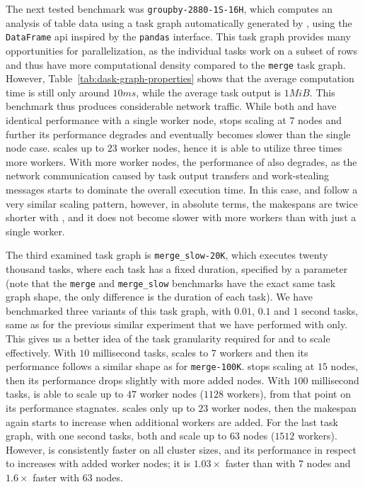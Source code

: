 The next tested benchmark was \texttt{groupby-2880-1S-16H}, which computes an analysis of table data
using a task graph automatically generated by \dask{}, using the
\texttt{DataFrame} \gls{api} inspired by the \texttt{pandas}
interface. This task graph provides many opportunities for parallelization, as the individual tasks
work on a subset of rows and thus have more computational density compared to the
\texttt{merge} task graph. However, Table~\ref{tab:dask-graph-properties} shows that the
average computation time is still only around $10ms$, while the average task
output is $1 MiB$. This benchmark thus produces considerable network traffic.
While both \dask{} and \rsds{} have identical performance
with a single worker node, \dask{} stops scaling at $7$
nodes and further its performance degrades and eventually becomes slower than the single node case.
\rsds{} scales up to $23$ worker nodes, hence it is able
to utilize three times more workers. With more worker nodes, the performance of
\rsds{} also degrades, as the network communication caused by task output
transfers and work-stealing messages starts to dominate the overall execution time. In this case,
\dask{} and \rsds{} follow a very similar scaling pattern,
however, in absolute terms, the makespans are twice shorter with \rsds{}, and
it does not become slower with more workers than with just a single worker.

The third examined task graph is \texttt{merge\_slow-20K}, which executes twenty thousand tasks,
where each task has a fixed duration, specified by a parameter (note that the
\texttt{merge} and \texttt{merge\_slow} benchmarks have the exact same task
graph shape, the only difference is the duration of each task). We have benchmarked three variants
of this task graph, with $0.01$, $0.1$ and
$1$ second tasks, same as for the previous similar experiment that we have
performed with \dask{} only. This gives us a better idea of the task
granularity required for \dask{} and \rsds{} to scale
effectively. With $10$ millisecond tasks, \dask{} scales
to $7$ workers and then its performance follows a similar shape as for
\texttt{merge-100K}. \rsds{} stops scaling at
$15$ nodes, then its performance drops slightly with more added nodes. With
$100$ millisecond tasks, \rsds{} is able to scale up to
$47$ worker nodes ($1128$ workers), from that point on
its performance stagnates. \dask{} scales only up to $23$
worker nodes, then the makespan again starts to increase when additional workers are added. For the
last task graph, with one second tasks, both \rsds{} and
\dask{} scale up to $63$ nodes
($1512$ workers). However, \rsds{} is consistently faster
on all cluster sizes, and its performance in respect to \dask{} increases with
added worker nodes; it is $1.03\times$ faster than \dask{} with
$7$ nodes and $1.6\times$ faster with
$63$ nodes.

